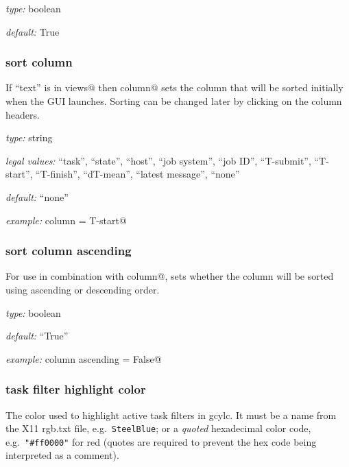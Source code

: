\begin{myitemize}
\item {\em type:} boolean
\item {\em default:} True
\end{myitemize}


\subsubsection{sort column}

If ``text'' is in \lstinline@initial views@ then \lstinline@sort column@ sets
the column that will be sorted initially when the GUI launches. Sorting can be
changed later by clicking on the column headers.

\begin{myitemize}
    \item {\em type:} string
    \item {\em legal values:} ``task'', ``state'', ``host'', ``job system'',
        ``job ID'', ``T-submit'', ``T-start'', ``T-finish'', ``dT-mean'',
        ``latest message'', ``none''
    \item {\em default:} ``none''
    \item {\em example:} \lstinline@sort column = T-start@
\end{myitemize}


\subsubsection{sort column ascending}

For use in combination with \lstinline@sort column@, sets whether the column will
be sorted using ascending or descending order.

\begin{myitemize}
    \item {\em type:} boolean
    \item {\em default:} ``True''
    \item {\em example:} \lstinline@sort column ascending = False@
\end{myitemize}


\subsubsection{task filter highlight color}

The color used to highlight active task filters in gcylc. It must be a name
from the X11 rgb.txt file, e.g.\ \lstinline=SteelBlue=; or a
{\em quoted} hexadecimal color code, e.g.\ \lstinline="#ff0000"= for red (quotes
are required to prevent the hex code being interpreted as a comment).

